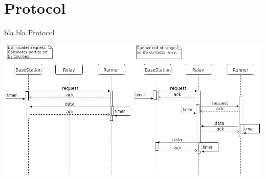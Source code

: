 \section{Protocol}\label{th:theory}
bla bla Protocol

\includegraphics[width=0.7\linewidth]{theory/protocol/toHopOrNotArqSequence}\label{fig:tohopornotarqsequence}

